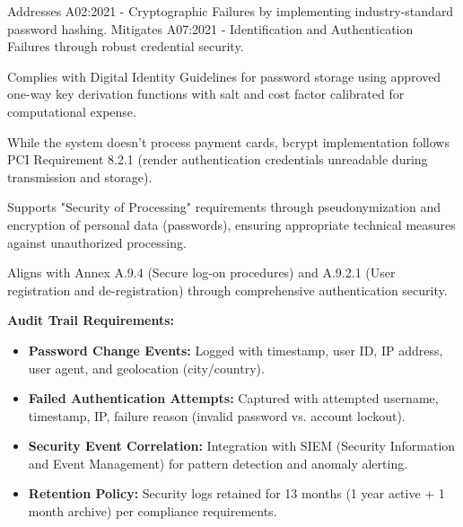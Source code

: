 \documentclass[12pt,a4paper]{article}
\begin{document}
\begin{description}[leftmargin=2em, itemsep=8pt, style=nextline]
    \item[\textbf{OWASP Top 10 (2021):}] Addresses A02:2021 - Cryptographic Failures by implementing industry-standard password hashing. Mitigates A07:2021 - Identification and Authentication Failures through robust credential security.
    
    \item[\textbf{NIST SP 800-63B:}] Complies with Digital Identity Guidelines for password storage using approved one-way key derivation functions with salt and cost factor calibrated for computational expense.
    
    \item[\textbf{PCI DSS 4.0:}] While the system doesn't process payment cards, bcrypt implementation follows PCI Requirement 8.2.1 (render authentication credentials unreadable during transmission and storage).
    
    \item[\textbf{GDPR Article 32:}] Supports "Security of Processing" requirements through pseudonymization and encryption of personal data (passwords), ensuring appropriate technical measures against unauthorized processing.
    
    \item[\textbf{ISO 27001:2022:}] Aligns with Annex A.9.4 (Secure log-on procedures) and A.9.2.1 (User registration and de-registration) through comprehensive authentication security.
\end{description}

\vspace{0.5em}

\textbf{Audit Trail Requirements:}

\begin{itemize}[leftmargin=2em, itemsep=6pt]
    \item \textbf{Password Change Events:} Logged with timestamp, user ID, IP address, user agent, and geolocation (city/country).
    \item \textbf{Failed Authentication Attempts:} Captured with attempted username, timestamp, IP, failure reason (invalid password vs. account lockout).
    \item \textbf{Security Event Correlation:} Integration with SIEM (Security Information and Event Management) for pattern detection and anomaly alerting.
    \item \textbf{Retention Policy:} Security logs retained for 13 months (1 year active + 1 month archive) per compliance requirements.
\end{itemize}
\end{document}
